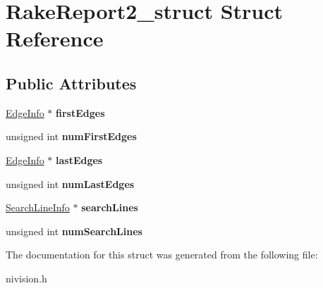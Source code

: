 \hypertarget{structRakeReport2__struct}{\section{\-Rake\-Report2\-\_\-struct \-Struct \-Reference}
\label{structRakeReport2__struct}
}
\subsection*{\-Public \-Attributes}
\begin{DoxyCompactItemize}
\item 
\hypertarget{structRakeReport2__struct_aec930438c2a16ef69c31ec8d232caebb}{\hyperlink{structEdgeInfo__struct}{\-Edge\-Info} $\ast$ {\bfseries first\-Edges}}\label{structRakeReport2__struct_aec930438c2a16ef69c31ec8d232caebb}

\item 
\hypertarget{structRakeReport2__struct_a8c28717b6e2f18f9d02d9a454fd30c79}{unsigned int {\bfseries num\-First\-Edges}}\label{structRakeReport2__struct_a8c28717b6e2f18f9d02d9a454fd30c79}

\item 
\hypertarget{structRakeReport2__struct_ad1b99b98736e6f6461f2f4fdfb161817}{\hyperlink{structEdgeInfo__struct}{\-Edge\-Info} $\ast$ {\bfseries last\-Edges}}\label{structRakeReport2__struct_ad1b99b98736e6f6461f2f4fdfb161817}

\item 
\hypertarget{structRakeReport2__struct_ae90a30da69f347754a84757db874475e}{unsigned int {\bfseries num\-Last\-Edges}}\label{structRakeReport2__struct_ae90a30da69f347754a84757db874475e}

\item 
\hypertarget{structRakeReport2__struct_a88dd8ef9d57cc6feccf5b0e9f9a32e00}{\hyperlink{structSearchLineInfo__struct}{\-Search\-Line\-Info} $\ast$ {\bfseries search\-Lines}}\label{structRakeReport2__struct_a88dd8ef9d57cc6feccf5b0e9f9a32e00}

\item 
\hypertarget{structRakeReport2__struct_a651a5f86ed3612f910c3098223ea22ea}{unsigned int {\bfseries num\-Search\-Lines}}\label{structRakeReport2__struct_a651a5f86ed3612f910c3098223ea22ea}

\end{DoxyCompactItemize}


\-The documentation for this struct was generated from the following file\-:\begin{DoxyCompactItemize}
\item 
nivision.\-h\end{DoxyCompactItemize}
